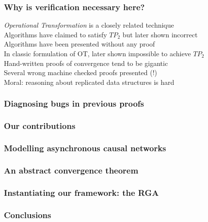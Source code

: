 \documentclass[professionalfonts,smallfonts]{beamer}
\begin{document}
\begin{frame}
\frametitle{Why is verification necessary here?}
\emph{Operational Transformation} is a closely related technique
\\[1.5ex]
Algorithms have claimed to satisfy $TP_2$ but later shown incorrect
\\[1.5ex]
Algorithms have been presented without any proof
\\[1.5ex]
In classic formulation of OT, later shown impossible to achieve $TP_2$
\\[1.5ex]
Hand-written proofs of convergence tend to be gigantic
\\[1.5ex]
Several wrong machine checked proofs presented (!)
\\[1.5ex]
Moral: reasoning about replicated data structures is hard
\end{frame}

\begin{frame}
\frametitle{Diagnosing bugs in previous proofs}
\end{frame}

\begin{frame}
\frametitle{Our contributions}
\end{frame}

\begin{frame}
\frametitle{Modelling asynchronous causal networks}
\end{frame}

\begin{frame}
\frametitle{An abstract convergence theorem}
\end{frame}

\begin{frame}
\frametitle{Instantiating our framework: the RGA}
\end{frame}

\begin{frame}
\frametitle{Conclusions}
\end{frame}
\end{document}
